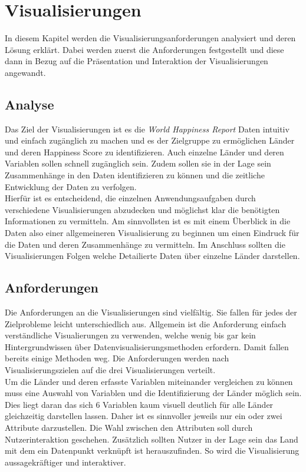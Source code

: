 \section{Visualisierungen}
In diesem Kapitel werden die Visualisierungsanforderungen analysiert und deren Lösung erklärt. Dabei werden zuerst die Anforderungen festgestellt und diese dann in Bezug auf die Präsentation und Interaktion der Visualisierungen angewandt.  

\subsection{Analyse}

Das Ziel der Visualisierungen ist es die \textit{World Happiness Report} Daten intuitiv und einfach zugänglich zu machen und es der Zielgruppe zu ermöglichen Länder und deren Happiness Score zu identifizieren. Auch einzelne Länder und deren Variablen sollen schnell zugänglich sein. Zudem sollen sie in der Lage sein Zusammenhänge in den Daten identifizieren zu können und die zeitliche Entwicklung der Daten zu verfolgen. \\

Hierfür ist es entscheidend, die einzelnen Anwendungsaufgaben durch verschiedene Visualisierungen abzudecken und möglichst klar die benötigten Informationen zu vermitteln.
Am sinnvollsten ist es mit einem Überblick in die Daten also einer allgemeineren Visualisierung zu beginnen um einen Eindruck für die Daten und deren Zusammenhänge zu vermitteln. Im Anschluss sollten die Visualisierungen Folgen welche Detailierte Daten über einzelne Länder darstellen. \\

\subsection{Anforderungen}
Die Anforderungen an die Visualisierungen sind vielfältig. Sie fallen für jedes der Zielprobleme leicht unterschiedlich aus. Allgemein ist die Anforderung einfach verständliche Visualierungen zu verwenden, welche wenig bis gar kein Hintergrundwissen über Datenvisualisierungsmethoden erfordern. Damit fallen bereits einige Methoden weg. Die Anforderungen werden nach Visualisierungszielen auf die drei Visualisierungen verteilt.\\

Um die Länder und deren erfasste Variablen miteinander vergleichen zu können muss eine Auswahl von Variablen und die Identifizierung der Länder möglich sein. Dies liegt daran das sich 6 Variablen kaum visuell deutlich  für alle Länder gleichzeitig darstellen lassen. Daher ist es sinnvoller jeweils nur ein oder zwei Attribute darzustellen. Die Wahl zwischen den Attributen soll durch Nutzerinteraktion geschehen. Zusätzlich sollten Nutzer in der Lage sein das Land mit dem ein Datenpunkt verknüpft ist herauszufinden. So wird die Visualisierung aussagekräftiger und interaktiver.\\

